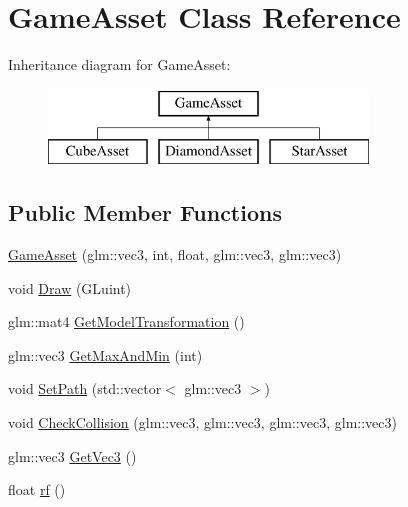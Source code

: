 \hypertarget{classGameAsset}{}\section{Game\+Asset Class Reference}
\label{classGameAsset}
Inheritance diagram for Game\+Asset\+:\begin{figure}[H]
\begin{center}
\leavevmode
\includegraphics[height=2.000000cm]{classGameAsset}
\end{center}
\end{figure}
\subsection*{Public Member Functions}
\begin{DoxyCompactItemize}
\item 
\hyperlink{classGameAsset_af9ed34597a36fb804d2dc94c45ace9e4}{Game\+Asset} (glm\+::vec3, int, float, glm\+::vec3, glm\+::vec3)
\item 
void \hyperlink{classGameAsset_a0fa1c4bf4ae5883ff3e4a1c45930142a}{Draw} (G\+Luint)
\item 
glm\+::mat4 \hyperlink{classGameAsset_a9cca0cbeff2eac427a8432080b4cf0e1}{Get\+Model\+Transformation} ()
\item 
glm\+::vec3 \hyperlink{classGameAsset_aae7fdb56570d231fb1043905c642f788}{Get\+Max\+And\+Min} (int)
\item 
void \hyperlink{classGameAsset_a9878afd59b6865a5efce633c4b00f22b}{Set\+Path} (std\+::vector$<$ glm\+::vec3 $>$)
\item 
void \hyperlink{classGameAsset_aab3657266027478ee2d9f5b1810e85d3}{Check\+Collision} (glm\+::vec3, glm\+::vec3, glm\+::vec3, glm\+::vec3)
\item 
glm\+::vec3 \hyperlink{classGameAsset_a93faa30868a56e605fbc10bb6e72d971}{Get\+Vec3} ()
\item 
float \hyperlink{classGameAsset_a3f6eafb236f1f605c7c7dfe7720c87d9}{rf} ()
\end{DoxyCompactItemize}
